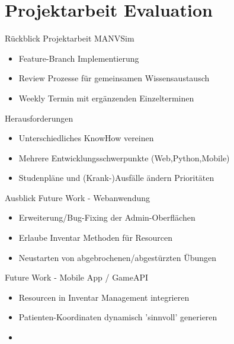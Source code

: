 \section{Projektarbeit Evaluation}

\begin{frame}{Rückblick}
	Projektarbeit MANVSim 
	\begin{itemize}
		\item Feature-Branch Implementierung
		\item Review Prozesse für gemeinsamen Wissensaustausch
		\item Weekly Termin mit ergänzenden Einzelterminen
	\end{itemize}
    Herausforderungen
	\begin{itemize}
		\item Unterschiedliches KnowHow vereinen
		\item Mehrere Entwicklungsschwerpunkte (Web,Python,Mobile)
		\item Studenpläne und (Krank-)Ausfälle ändern Prioritäten
	\end{itemize}
\end{frame}
\begin{frame}{Ausblick}
	Future Work - Webanwendung
	\begin{itemize}
		\item Erweiterung/Bug-Fixing der Admin-Oberflächen
		\item Erlaube Inventar Methoden für Resourcen
		\item Neustarten von abgebrochenen/abgestürzten Übungen
	\end{itemize}
    Future Work - Mobile App / GameAPI
	\begin{itemize}
		\item Resourcen in Inventar Management integrieren
		\item Patienten-Koordinaten dynamisch 'sinnvoll' generieren
		\item 
	\end{itemize}
\end{frame}